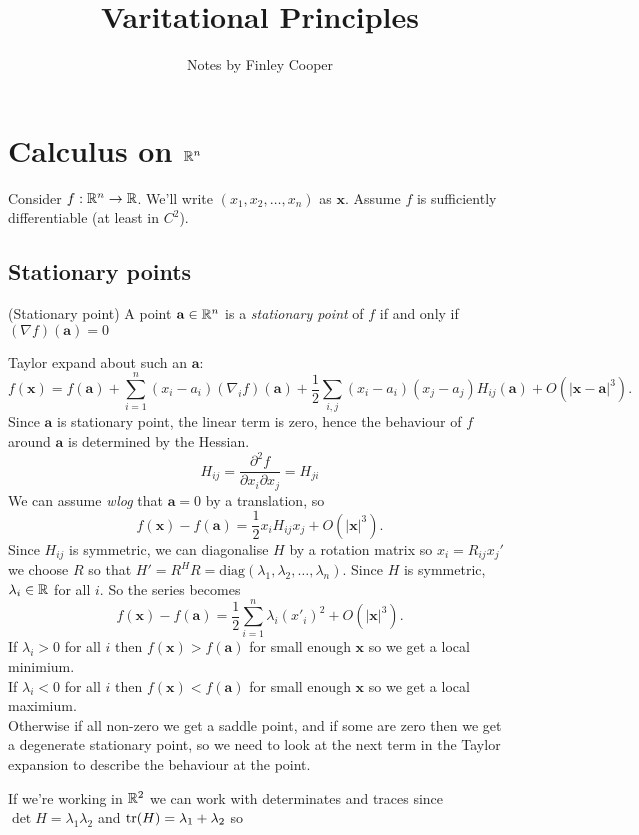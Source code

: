 \documentclass{article}
\title{Varitational Principles}
\author{Notes by Finley Cooper}
\begin{document}
  \maketitle
  \newpage
  \tableofcontents
  \newpage
  \section{Calculus on $ \mathbb{R}^n $}
  Consider $ f:\mathbb{R}^n\to \mathbb{R} $. We'll write $ (x_1,x_2,\dots,x_n) $ as $ \mathbf x $. Assume $ f $ is sufficiently differentiable (at least in $ C^2 $).
  \subsection{Stationary points}
  \begin{definition}
	  (Stationary point) A point $\mathbf a\in \mathbb{R}^n  $ is a \textit{stationary point} of $ f $ if and only if $ (\nabla f)(\mathbf a)=0 $
  \end{definition}
  Taylor expand about such an $ \mathbf a $:
  \[
	  f(\mathbf x)=f(\mathbf a)+\sum_{i=1}^n(x_i-a_i)(\nabla_i f)(\mathbf a)+\frac 12 \sum_{i,j}(x_i-a_i)(x_j-a_j)H_{ij}(\mathbf a)+O(|\mathbf x-\mathbf a|^3).
  \]
  Since $ \mathbf a $ is stationary point, the linear term is zero, hence the behaviour of $ f $ around $ \mathbf a $ is determined by the Hessian.
  \[
	  H_{ij}=\frac{\partial^2 f}{\partial x_i\partial x_j}=H_{ji}
  \]
  We can assume \textit{wlog} that $ \mathbf a = 0 $ by a translation, so
  \[
	  f(\mathbf x)-f(\mathbf a)=\frac 12 x_iH_{ij}x_j+O(|\mathbf x|^3).
  \]
  Since $ H_{ij} $ is symmetric, we can diagonalise $ H $ by a rotation matrix so $ x_i=R_{ij}x_j' $ we choose $ R $ so that
  $ H'=R^HR=\mathrm{diag}(\lambda_1,\lambda_2,\dots,\lambda_n) $. Since $ H $ is symmetric, $ \lambda_i\in \mathbb{R} $ for all $ i $. So the series becomes
  \[
	  f(\mathbf x)-f(\mathbf a)=\frac 12 \sum_{i=1}^n\lambda_i(x'_i)^2+O(|\mathbf x|^3).
  \]
  If $ \lambda_i>0 $ for all $ i $ then $ f(\mathbf x)>f(\mathbf a) $ for small enough $ \mathbf x $ so we get a local minimium.\\
  If $ \lambda_i<0 $ for all $ i $ then $ f(\mathbf x)<f(\mathbf a) $ for small enough $ \mathbf x $ so we get a local maximium.\\
  Otherwise if all non-zero we get a saddle point, and if some are zero then we get a degenerate stationary point, so we need to look at the next term in the Taylor expansion to describe the behaviour at the point.\par
  If we're working in $ \mathbb{R}^2 $ we can work with determinates and traces since $ \det H=\lambda_1\lambda_2 $ and $ \tr(H)=\lambda_1+\lambda_2 $ so
\end{document}
